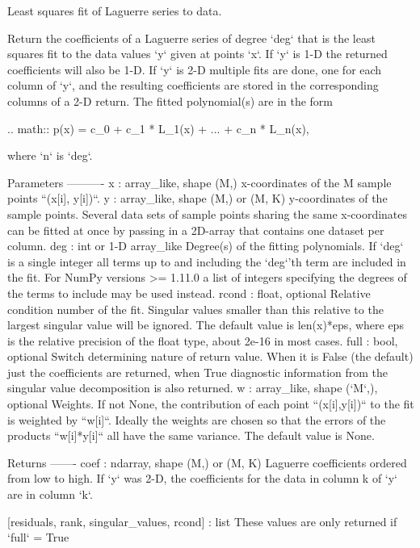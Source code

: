 \begin{DoxyVerb}Least squares fit of Laguerre series to data.

Return the coefficients of a Laguerre series of degree `deg` that is the
least squares fit to the data values `y` given at points `x`. If `y` is
1-D the returned coefficients will also be 1-D. If `y` is 2-D multiple
fits are done, one for each column of `y`, and the resulting
coefficients are stored in the corresponding columns of a 2-D return.
The fitted polynomial(s) are in the form

.. math::  p(x) = c_0 + c_1 * L_1(x) + ... + c_n * L_n(x),

where `n` is `deg`.

Parameters
----------
x : array_like, shape (M,)
    x-coordinates of the M sample points ``(x[i], y[i])``.
y : array_like, shape (M,) or (M, K)
    y-coordinates of the sample points. Several data sets of sample
    points sharing the same x-coordinates can be fitted at once by
    passing in a 2D-array that contains one dataset per column.
deg : int or 1-D array_like
    Degree(s) of the fitting polynomials. If `deg` is a single integer
    all terms up to and including the `deg`'th term are included in the
    fit. For NumPy versions >= 1.11.0 a list of integers specifying the
    degrees of the terms to include may be used instead.
rcond : float, optional
    Relative condition number of the fit. Singular values smaller than
    this relative to the largest singular value will be ignored. The
    default value is len(x)*eps, where eps is the relative precision of
    the float type, about 2e-16 in most cases.
full : bool, optional
    Switch determining nature of return value. When it is False (the
    default) just the coefficients are returned, when True diagnostic
    information from the singular value decomposition is also returned.
w : array_like, shape (`M`,), optional
    Weights. If not None, the contribution of each point
    ``(x[i],y[i])`` to the fit is weighted by ``w[i]``. Ideally the
    weights are chosen so that the errors of the products ``w[i]*y[i]``
    all have the same variance.  The default value is None.

Returns
-------
coef : ndarray, shape (M,) or (M, K)
    Laguerre coefficients ordered from low to high. If `y` was 2-D,
    the coefficients for the data in column k  of `y` are in column
    `k`.

[residuals, rank, singular_values, rcond] : list
    These values are only returned if `full` = True


\end{DoxyVerb}
